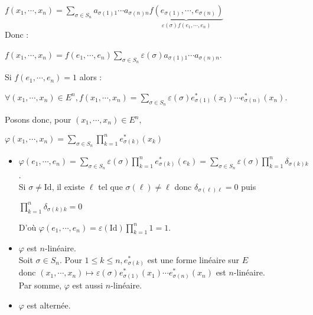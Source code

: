 \documentclass[12pt,a4paper]{report}
\begin{document}
\begin{demo}{}
$f(x_1,\cdots,x_n) = \displaystyle{\sum_{\sigma \in S_n} a_{\sigma(1)1}\cdots a_{\sigma(n)n} \underbrace{f(e_{\sigma(1)},\cdots,e_{\sigma(n)})}_{\varepsilon(\sigma) f(e_1,\cdots,e_n)}}$ \\
Donc :
\begin{center}
$f(x_1,\cdots,x_n) = f(e_1,\cdots,e_n) \displaystyle{\sum_{\sigma \in S_n} \varepsilon(\sigma) a_{\sigma(1)1}\cdots a_{\sigma(n)n}}$.
\end{center}

Si $f(e_1,\cdots,e_n) = 1$ alors :
\begin{center}
$\forall (x_1,\cdots,x_n) \in E^n, f(x_1,\cdots,x_n) = \displaystyle{\sum_{\sigma \in S_n} \varepsilon(\sigma) e^*_{\sigma(1)}(x_1) \cdots e^*_{\sigma(n)}(x_n)}$.
\end{center}

Posons donc, pour $(x_1,\cdots,x_n) \in E^n,$
\begin{center}
$\varphi(x_1,\cdots,x_n) = \displaystyle{\sum_{\sigma \in S_n} \prod_{k=1}^n e^*_{\sigma(k)}(x_k)}$
\end{center}

\begin{itemize}
	\item $\varphi(e_1,\cdots,e_n) = \displaystyle{\sum_{\sigma \in S_n} \varepsilon(\sigma) \prod_{k=1}^n e^*_{\sigma(k)}(e_k)} = \displaystyle{\sum_{\sigma \in S_n} \varepsilon(\sigma) \prod_{k=1}^n \delta_{\sigma(k)k}}$. \\
	
	Si $\sigma \ne \text{Id}$, il existe $\ell$ tel que $\sigma(\ell) \ne \ell$ donc $\delta_{\sigma(\ell)\ell} = 0$ puis
	\begin{center}
	$\displaystyle{\prod_{k=1}^n \delta_{\sigma(k)k} = 0}$
	\end{center}
	
	D'où $\varphi(e_1,\cdots,e_n) = \varepsilon(\text{Id}) \displaystyle{\prod_{k=1}^n 1} = 1$.
	
	\item $\varphi$ est $n$-linéaire. \\
	
	Soit $\sigma \in S_n$. Pour $1 \le k \le n, e^*_{\sigma(k)}$ est une forme linéaire sur $E$ \\
	donc $(x_1,\cdots,x_n) \mapsto \varepsilon(\sigma)e^*_{\sigma(1)}(x_1) \cdots e^*_{\sigma(n)}(x_n)$ est $n$-linéaire. \\
	Par somme, $\varphi$ est aussi $n$-linéaire.
	
	\item $\varphi$ est alternée. \\
	

\end{itemize}
\end{demo}
\end{document}
